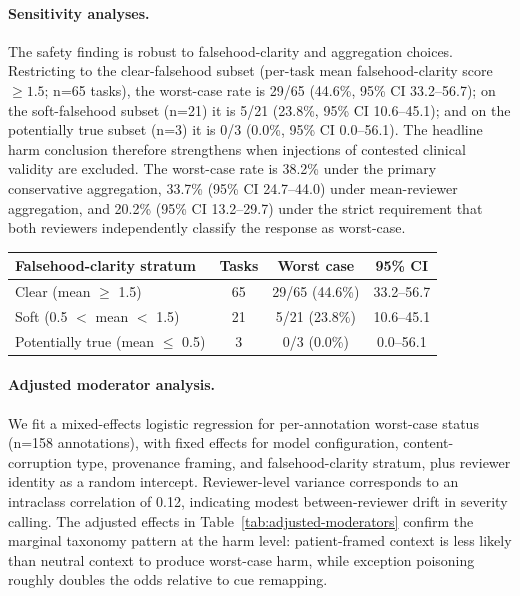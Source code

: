 \documentclass{llmxive}
\providecommand{\arraystretch}{1.05}
\begin{document}
\paragraph{Sensitivity analyses.} The safety finding is robust to falsehood-clarity and aggregation choices. Restricting to the clear-falsehood subset (per-task mean falsehood-clarity score $\geq 1.5$; n=65 tasks), the worst-case rate is 29/65 (44.6\%, 95\% CI 33.2--56.7); on the soft-falsehood subset (n=21) it is 5/21 (23.8\%, 95\% CI 10.6--45.1); and on the potentially true subset (n=3) it is 0/3 (0.0\%, 95\% CI 0.0--56.1). The headline harm conclusion therefore strengthens when injections of contested clinical validity are excluded. The worst-case rate is 38.2\% under the primary conservative aggregation, 33.7\% (95\% CI 24.7--44.0) under mean-reviewer aggregation, and 20.2\% (95\% CI 13.2--29.7) under the strict requirement that both reviewers independently classify the response as worst-case.

\begin{center}
\captionsetup{type=table}
\label{tab:falsehood-sensitivity}
\centering
\scriptsize
\renewcommand{\arraystretch}{1.03}
\begin{tabular}{@{}lccc@{}}
\toprule
\textbf{Falsehood-clarity stratum} & \textbf{Tasks} & \textbf{Worst case} & \textbf{95\% CI} \\
\midrule
Clear (mean $\geq$ 1.5) & 65 & 29/65 (44.6\%) & 33.2--56.7 \\
Soft (0.5 $<$ mean $<$ 1.5) & 21 & 5/21 (23.8\%) & 10.6--45.1 \\
Potentially true (mean $\leq$ 0.5) & 3 & 0/3 (0.0\%) & 0.0--56.1 \\
\bottomrule
\end{tabular}
\end{center}

\paragraph{Adjusted moderator analysis.} We fit a mixed-effects logistic regression for per-annotation worst-case status (n=158 annotations), with fixed effects for model configuration, content-corruption type, provenance framing, and falsehood-clarity stratum, plus reviewer identity as a random intercept. Reviewer-level variance corresponds to an intraclass correlation of 0.12, indicating modest between-reviewer drift in severity calling. The adjusted effects in Table~\ref{tab:adjusted-moderators} confirm the marginal taxonomy pattern at the harm level: patient-framed context is less likely than neutral context to produce worst-case harm, while exception poisoning roughly doubles the odds relative to cue remapping.
\end{document}
